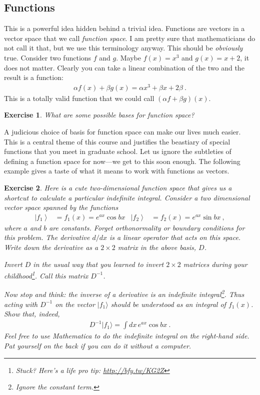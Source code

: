 \documentclass[
  11pt,
	colorful,
	raggedright,
]{tufte-style-thesis-flip}
\newtheorem{exercise}{Exercise}[section]
\begin{document}
\subsection{Functions}

This is a powerful idea hidden behind a trivial idea. Functions are vectors in a vector space that we call \emph{function space}. I am pretty sure that mathematicians do not call it that, but we use this terminology anyway.  This should be \emph{obviously} true. Consider two functions $f$ and $g$. Maybe $f(x) = x^3$ and $g(x) = x + 2$, it does not matter. Clearly you can take a linear combination of the two and the result is a function:
\begin{align}
  \alpha f(x) + \beta g(x) = \alpha x^3 + \beta x + 2\beta \ .
\end{align}
This is a totally valid function that we could call $(\alpha f + \beta g)(x)$. 

\begin{exercise}
What are some possible bases for function space?
\end{exercise}

A judicious choice of basis for function space can make our lives much easier. This is a central theme of this course and justifies the beastiary of special functions that you meet in graduate school. Let us ignore the subtleties of defining a function space for now---we get to this soon enough. The following example gives a taste of what it means to work with functions as vectors.


\begin{exercise}

Here is a cute two-dimensional function space that gives us a shortcut to calculate a particular \emph{indefinite} integral.  Consider a two dimensional vector space spanned by the functions
\begin{align}
  \left|f_1\right\rangle
  &= f_1(x) = 
  e^{ax} \cos bx
  &
  \left|f_2\right\rangle
  &=
  f_2(x) = 
  e^{ax} \sin bx \ ,
\end{align}
where $a$ and $b$ are constants. Forget orthonormality or boundary conditions for this problem. The derivative $d/dx$ is a linear operator that acts on this space. Write down the derivative as a $2\times 2$ matrix in the above basis, $D$.

Invert $D$ in the usual way that you learned to invert $2\times 2$ matrices during your childhood\footnote{Stuck? Here's a life pro tip: \url{http://bfy.tw/KG2Z}}. Call this matrix $D^{-1}$. 

Now stop and think: the inverse of a derivative is an indefinite integral\footnote{Ignore the constant term.}. Thus acting with $D^{-1}$ on the vector $|f_1\rangle$ should be understood as an integral of $f_1(x)$. Show that, indeed,
\begin{align}
  D^{-1} |f_1\rangle = \int dx\, e^{ax} \cos bx \ .
\end{align}
Feel free to use \emph{Mathematica} to do the indefinite integral on the right-hand side. Pat yourself on the back if you can do it without a computer.
\end{exercise}
\end{document}
